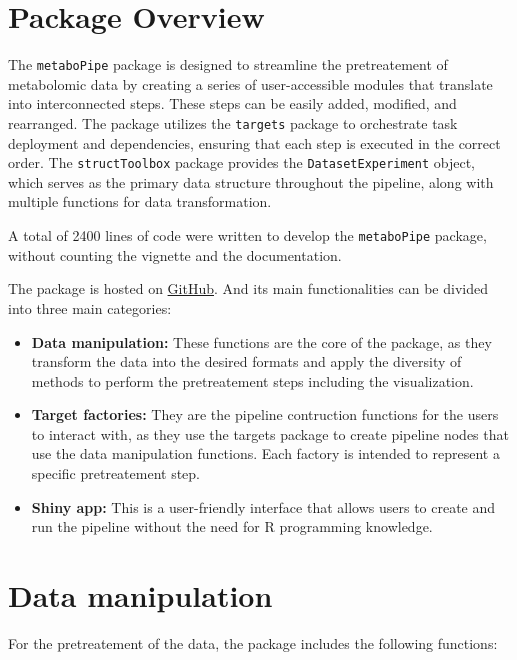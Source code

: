 \documentclass[ENG, BIB]{TFUOC}%
\begin{document}
\section{Package Overview}
The \texttt{metaboPipe} package is designed to streamline the pretreatement of metabolomic data by creating a series of user-accessible modules that translate into interconnected steps. These steps can be easily added, modified, and rearranged. The package utilizes the \texttt{targets} package to orchestrate task deployment and dependencies, ensuring that each step is executed in the correct order. The \texttt{structToolbox} package provides the \texttt{DatasetExperiment} object, which serves as the primary data structure throughout the pipeline, along with multiple functions for data transformation.

A total of 2400 lines of code were written to develop the \texttt{metaboPipe} package, without counting the vignette and the documentation.

The package is hosted on \href{https://github.com/eperezme/metaboPipe}{GitHub}. And its main functionalities can be divided into three main categories:
\begin{itemize}
    \item \textbf{Data manipulation:} These functions are the core of the package, as they transform the data into the desired formats and apply the diversity of methods to perform the pretreatement steps including the visualization.
    \item \textbf{Target factories:} They are the pipeline contruction functions for the users to interact with, as they use the targets package to create pipeline nodes that use the data manipulation functions. Each factory is intended to represent a specific pretreatement step.
    \item \textbf{Shiny app:} This is a user-friendly interface that allows users to create and run the pipeline without the need for R programming knowledge.
\end{itemize}

\section{Data manipulation}
For the pretreatement of the data, the package includes the following functions:
\end{document}

